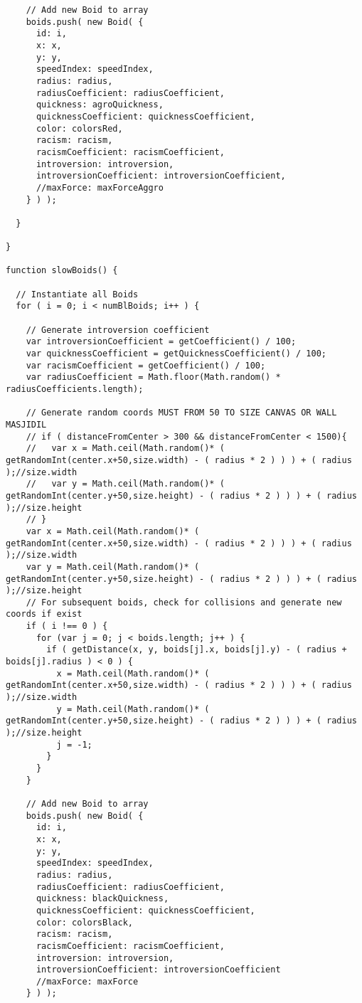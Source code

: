 \begin{lstlisting}
    // Add new Boid to array
    boids.push( new Boid( {
      id: i,
      x: x,
      y: y,
      speedIndex: speedIndex,
      radius: radius,
      radiusCoefficient: radiusCoefficient,
      quickness: agroQuickness,
      quicknessCoefficient: quicknessCoefficient,
      color: colorsRed,
      racism: racism,
      racismCoefficient: racismCoefficient,
      introversion: introversion,
      introversionCoefficient: introversionCoefficient,
      //maxForce: maxForceAggro
    } ) );

  }

}

function slowBoids() {

  // Instantiate all Boids
  for ( i = 0; i < numBlBoids; i++ ) {

    // Generate introversion coefficient
    var introversionCoefficient = getCoefficient() / 100;
    var quicknessCoefficient = getQuicknessCoefficient() / 100;
    var racismCoefficient = getCoefficient() / 100;
    var radiusCoefficient = Math.floor(Math.random() * radiusCoefficients.length);

    // Generate random coords MUST FROM 50 TO SIZE CANVAS OR WALL MASJIDIL
    // if ( distanceFromCenter > 300 && distanceFromCenter < 1500){
    //   var x = Math.ceil(Math.random()* ( getRandomInt(center.x+50,size.width) - ( radius * 2 ) ) ) + ( radius );//size.width
    //   var y = Math.ceil(Math.random()* ( getRandomInt(center.y+50,size.height) - ( radius * 2 ) ) ) + ( radius );//size.height
    // }
    var x = Math.ceil(Math.random()* ( getRandomInt(center.x+50,size.width) - ( radius * 2 ) ) ) + ( radius );//size.width
    var y = Math.ceil(Math.random()* ( getRandomInt(center.y+50,size.height) - ( radius * 2 ) ) ) + ( radius );//size.height
    // For subsequent boids, check for collisions and generate new coords if exist
    if ( i !== 0 ) {
      for (var j = 0; j < boids.length; j++ ) {
        if ( getDistance(x, y, boids[j].x, boids[j].y) - ( radius + boids[j].radius ) < 0 ) {
          x = Math.ceil(Math.random()* ( getRandomInt(center.x+50,size.width) - ( radius * 2 ) ) ) + ( radius );//size.width
          y = Math.ceil(Math.random()* ( getRandomInt(center.y+50,size.height) - ( radius * 2 ) ) ) + ( radius );//size.height
          j = -1;
        }
      }
    }

    // Add new Boid to array
    boids.push( new Boid( {
      id: i,
      x: x,
      y: y,
      speedIndex: speedIndex,
      radius: radius,
      radiusCoefficient: radiusCoefficient,
      quickness: blackQuickness,
      quicknessCoefficient: quicknessCoefficient,
      color: colorsBlack,
      racism: racism,
      racismCoefficient: racismCoefficient,
      introversion: introversion,
      introversionCoefficient: introversionCoefficient
      //maxForce: maxForce
    } ) );


\end{lstlisting}
